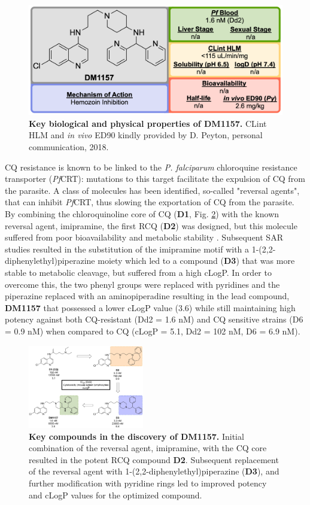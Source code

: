 \documentclass[twocolumn]{bmcart}%
\begin{document}
\begin{figure}[h]
	\includegraphics [scale=0.575] {Figure16}
	\caption{{\bf Key biological and physical properties of DM1157.} CLint HLM and \textit{in vivo} ED90 kindly provided by D. Peyton, personal communication, 2018.}
	\label{Figure16}
\end{figure}

CQ resistance is known to be linked to the \textit{P. falciparum} chloroquine resistance transporter (\textit{Pf}CRT): mutations to this target facilitate the expulsion of CQ from the parasite. A class of molecules has been identified, so-called "reversal agents", that can inhibit \textit{Pf}CRT, thus slowing the exportation of CQ from the parasite. By combining the chloroquinoline core of CQ (\textbf{D1}, Fig. \ref{Figure17}) with the known reversal agent, imipramine, the first RCQ (\textbf{D2}) was designed, but this molecule suffered from poor bioavailability and metabolic stability \cite{Burgess2006}. Subsequent SAR studies resulted in the substitution of the imipramine motif with a 1-(2,2-diphenylethyl)piperazine moiety which led to a compound (\textbf{D3}) that was more stable to metabolic cleavage, but suffered from a high cLogP. In order to overcome this, the two phenyl groups were replaced with pyridines and the piperazine replaced with an aminopiperadine resulting in the lead compound, \textbf{DM1157} that possessed a lower cLogP value (3.6) while still maintaining high potency against both CQ-resistant (Dd2 = 1.6 nM) and CQ sensitive strains (D6 = 0.9 nM) when compared to CQ (cLogP = 5.1, Dd2 = 102 nM, D6 = 6.9 nM).

\begin{figure}[h]
	\includegraphics [width=0.45\textwidth] {Figure17}
	\caption{{\bf Key compounds in the discovery of DM1157.} Initial combination of the reversal agent, imipramine, with the CQ core resulted in the potent RCQ compound \textbf{D2}. Subsequent replacement of the reversal agent with 1-(2,2-diphenylethyl)piperazine (\textbf{D3}), and further modification with pyridine rings led to improved potency and cLogP values for the optimized compound.}
	\label{Figure17}
\end{figure}
\end{document}
